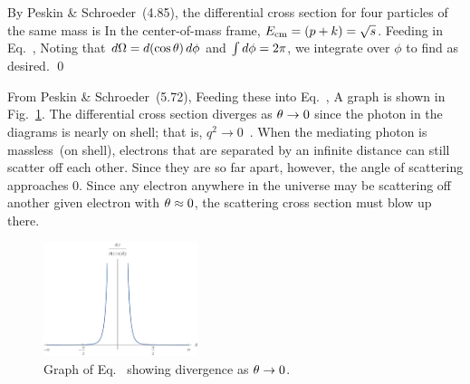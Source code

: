 \documentclass[11pt]{article}
\begin{document}
{{	}
	By Peskin \& Schroeder~(4.85), the differential cross section for four particles of the same mass is
	In the center-of-mass frame, $E_\text{cm} = (p + k) = \sqrt{s}$.  Feeding in Eq.~,
	Noting that $\dd{\Omega} = \dd{(\cos\theta)} \dd{\phi}$ and $\int \dd{\phi} = 2\pi$, we integrate over $\phi$ to find
	as desired. \qed
	
	From Peskin \& Schroeder~(5.72),
	Feeding these into Eq.~,
	A graph is shown in Fig.~\ref{f2}.  The differential cross section diverges as $\theta \to 0$ since the photon in the diagrams is nearly on shell; that is, $q^2 \to 0$~\cite[p.~155]{Peskin}.  When the mediating photon is massless~(on shell), electrons that are separated by an infinite distance can still scatter off each other.  Since they are so far apart, however, the angle of scattering approaches 0.  Since any electron anywhere in the universe may be scattering off another given electron with $\theta \approx 0$, the scattering cross section must blow up there.
	
	\begin{figure} \centering
		\includegraphics[width=0.4\textwidth]{2}
		\caption{Graph of Eq.~ showing divergence as $\theta \to 0$.}
		\label{f2}
	\end{figure}
}
\end{document}
